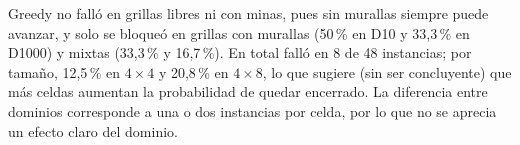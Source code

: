 Greedy no fall\'o en grillas libres ni con minas, pues sin murallas siempre
puede avanzar, y solo se bloque\'o en grillas con murallas (50\,\% en D10 y
33,3\,\% en D1000) y mixtas (33,3\,\% y 16,7\,\%). En total fall\'o en 8 de 48
instancias; por tama\~no, 12,5\,\% en $4\times4$ y 20,8\,\% en $4\times8$,
lo que sugiere (sin ser concluyente) que m\'as celdas aumentan la probabilidad
de quedar encerrado. La diferencia entre dominios corresponde a una o dos
instancias por celda, por lo que no se aprecia un efecto claro del dominio.
 